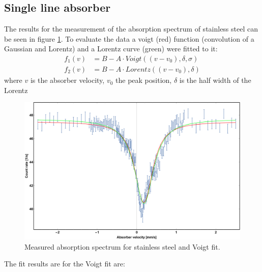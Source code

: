 \subsection{Single line absorber}
The results for the measurement of the absorption spectrum of stainless steel can be seen in figure \ref{fig:single line absorber:fitresult}. To evaluate the data a voigt (red) function (convolution of a Gaussian and Lorentz) and a Lorentz curve (green) were fitted to it:
\begin{equation}
\begin{aligned}
f_1(v)&=B - A \cdot Voigt((v-v_0),\delta,\sigma)\\
f_2(v)&=B - A \cdot Lorentz((v-v_0),\delta)
\end{aligned}
\end{equation}
where $v$ is the absorber velocity, $v_0$ the peak position, $\delta$ is the half width of the Lorentz
\begin{figure}[H]
\centering
\includegraphics[width=1.0\linewidth]{graphics/voigtfittry}
\caption[Stainless steel spectrum]{Measured absorption spectrum for stainless steel and Voigt fit.}
\label{fig:single line absorber:fitresult}
\end{figure}
The fit results are for the Voigt fit are:\\ \ \\

